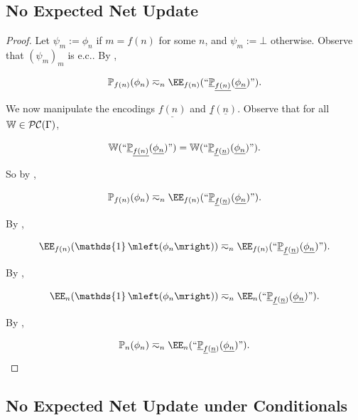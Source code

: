 \documentclass[authordate,onecolumn,noenvironments]{miri-tech-article}
\numberwithin{equation}{subsection}
\newcommand{\quot}[1]{``#1"}
\newcommand{\enc}[1]{{\underline{#1}}}
\newcommand{\ec}[1][\ ]{e.c.#1}
\newcommand{\BelState}{\mathbb{P}}
\newcommand{\pt}{\BelState}
\newcommand{\cworlds}{\mathcal{P\-C}} %
\newcommand{\World}{\mathbb{W}}
\newcommand{\Theory}{\Gamma}
\DeclareMathOperator{\OneOperator}{\mathds{1}}
\newcommand{\sentind}[1]{\OneOperator\mleft(#1\mright)}
\begin{document}
\subsection{No Expected Net Update}\label{app:ceu}

\restateceu*

\begin{proof}

  Let $\psi_m := \phi_n$ if $m = f(n)$ for some $n$, and $\psi_m := \bot$ otherwise.  Observe that $(\psi_m)_m$ is \ec[].  By ,

  \[ \pt_{f(n)}(\phi_n) \eqsim_n \EE_{f(n)}( \quot{ \enc{\pt}_{ \enc{f(n)} } (\enc{\phi_n})}  ). \]

We now manipulate the encodings $\enc{f(n)}$  and $\enc{f}(\enc{n})$. 
  Observe that for all $\World \in \cworlds(\Theory)$, 

  \[ \World ( \quot{ \enc{\pt}_{\enc{f(n)} } (\enc{\phi_n})}  ) = 
  \World ( \quot{ \enc{\pt}_{\enc{f}(\enc{n}) } (\enc{\phi_n})}  ). \]

  So by ,

  \[ \pt_{f(n)}(\phi_n) \eqsim_n \EE_{f(n)}( \quot{ \enc{\pt}_{\enc{f}(\enc{n}) } (\enc{\phi_n})}  ). \]

  By ,

  \[ \EE_{f(n)} (\sentind{\phi_n}) \eqsim_n \EE_{f(n)}( \quot{ \enc{\pt}_{\enc{f}(\enc{n}) } (\enc{\phi_n})}  ). \]

  By ,

  \[ \EE_n(\sentind{\phi_n})  \eqsim_n \EE_n( \quot{ \enc{\pt}_{\enc{f}(\enc{n}) } (\enc{\phi_n})}  ). \]

  By ,

  \[ \pt_n(\phi_n) \eqsim_n \EE_n( \quot{ \enc{\pt}_{\enc{f}(\enc{n}) } (\enc{\phi_n})}  ). \]

\end{proof}



\subsection{No Expected Net Update under Conditionals}\label{app:ccee}

\restateccee*
\end{document}
